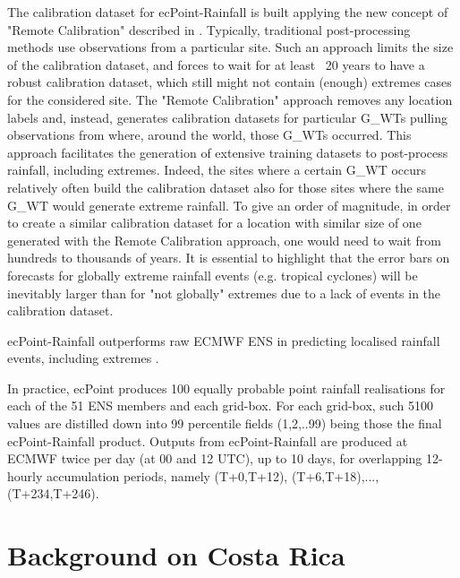 \documentclass[twocol]{ametsocV5} %
\begin{document}
The calibration dataset for ecPoint-Rainfall is built applying the new concept of "Remote Calibration" described in \citet{Hewson2020a}. Typically, traditional post-processing methods use observations from a particular site. Such an approach limits the size of the calibration dataset, and forces to wait for at least ~20 years to have a robust calibration dataset, which still might not contain (enough) extremes cases for the considered site. The "Remote Calibration" approach removes any location labels and, instead, generates calibration datasets for particular G\_WTs pulling observations from where, around the world, those G\_WTs occurred. This approach facilitates the generation of extensive training datasets to post-process rainfall, including extremes. Indeed, the sites where a certain G\_WT occurs relatively often build the calibration dataset also for those sites where the same G\_WT would generate extreme rainfall. To give an order of magnitude, in order to create a similar calibration dataset for a location with similar size of one generated with the Remote Calibration approach, one would need to wait from hundreds to thousands of years. It is essential to highlight that the error bars on forecasts for globally extreme rainfall events (e.g. tropical cyclones) will be inevitably larger than for "not globally" extremes due to a lack of events in the calibration dataset. \par
 ecPoint-Rainfall outperforms raw ECMWF ENS in predicting localised rainfall events, including extremes \citet{Hewson2020a}. \par
In practice, ecPoint produces 100 equally probable point rainfall realisations for each of the 51 ENS members and each grid-box. For each grid-box, such 5100 values are distilled down into 99 percentile fields (1,2,..99) being those the final ecPoint-Rainfall product. Outputs from ecPoint-Rainfall are produced at ECMWF twice per day (at 00 and 12 UTC), up to 10 days, for overlapping 12-hourly accumulation periods, namely (T+0,T+12), (T+6,T+18),...,(T+234,T+246).



\section{Background on Costa Rica}
\end{document}
